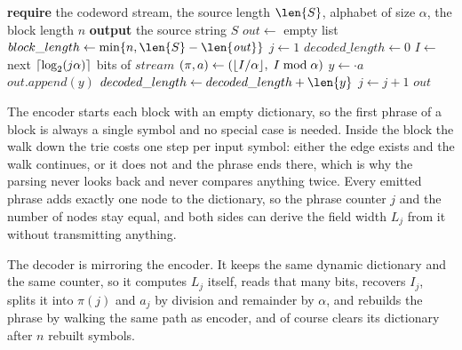 \begin{algorithm}[H]
\caption{LZ78 decoder}
\label{alg:lz78-decoder}
\begin{algorithmic}[1]
\State \textbf{require} the codeword stream, the source length \(\len{S}\), alphabet of size \(\alpha\), the block length \(n\)
\State \textbf{output} the source string \(S\)
\Statex
{}
    \State $\mathit{out} \gets$ empty list
        \State $block\_length \gets \min\{n, \len{S} - \len{\mathit{out}}\}$
        \State {}
        \State $j \gets 1$
        \State $decoded\_length \gets 0$
            \State $I \gets$ next $\left\lceil\log_2 (j \alpha)\right\rceil$ bits of $\mathit{stream}$
            \State $(\pi, a) \gets (\floor{I / \alpha},\; I \bmod \alpha)$
            \State $y \gets {}$$ \cdot a$
            \State $out.append(y)$
            \State $decoded\_length \gets decoded\_length + \len{y}$
            \State {}
            \State $j \gets j + 1$
        \EndWhile
    \EndWhile
    \State \Return $\mathit{out}$
\EndProcedure
\end{algorithmic}
\end{algorithm}

The encoder starts each block with an empty dictionary, so the first phrase of a block is always a single symbol and no special case is needed. Inside the block the walk down the trie costs one step per input symbol: either the edge exists and the walk continues, or it does not and the phrase ends there, which is why the parsing never looks back and never compares anything twice. Every emitted phrase adds exactly one node to the dictionary, so the phrase counter \(j\) and the number of nodes stay equal, and both sides can derive the field width \(L_j\) from it without transmitting anything.

The decoder is mirroring the encoder. It keeps the same dynamic dictionary and the same counter, so it computes \(L_j\) itself, reads that many bits, recovers \(I_j\), splits it into \(\pi(j)\) and \(a_j\) by division and remainder by \(\alpha\), and rebuilds the phrase by walking the same path as encoder, and of course clears its dictionary after \(n\) rebuilt symbols.
